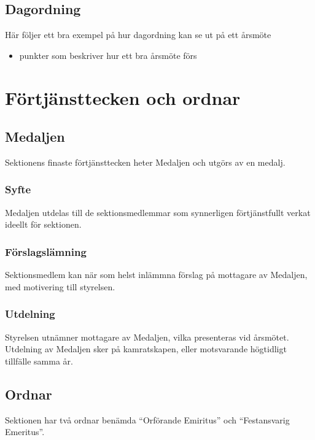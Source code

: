 \documentclass{../resources/dgovdoc}
\begin{document}
\subsection{Dagordning}

Här följer ett bra exempel på hur dagordning kan se ut på ett årsmöte

\begin{itemize}
\item punkter som beskriver hur ett bra årsmöte förs
\end{itemize}

\section{Förtjänsttecken och ordnar}

\subsection{Medaljen}

Sektionens finaste förtjänsttecken heter Medaljen och utgörs av en medalj. 

\subsubsection{Syfte}

Medaljen utdelas till de sektionsmedlemmar som synnerligen förtjänstfullt verkat ideellt för sektionen. 

\subsubsection{Förslagslämning}

Sektionsmedlem kan när som helst inlämmna förslag på mottagare av Medaljen, med motivering till styrelsen. 

\subsubsection{Utdelning}

Styrelsen utnämner mottagare av Medaljen, vilka presenteras vid årsmötet. Utdelning av Medaljen sker på kamratskapen, eller motsvarande högtidligt tillfälle samma år. 

\subsection{Ordnar}

Sektionen har två ordnar benämda ``Orförande Emiritus'' och ``Festansvarig Emeritus''.
\end{document}
